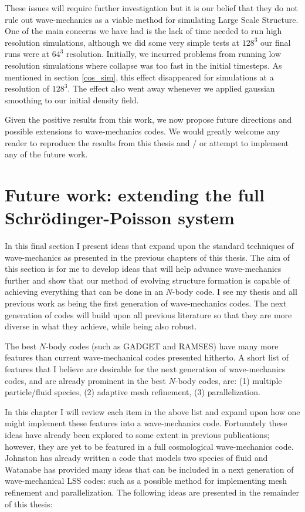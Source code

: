 These issues will require further investigation but it is our belief that they do not rule out wave-mechanics as a viable method for simulating Large Scale Structure. One of the main concerns we have had is the lack of time needed to run high resolution simulations, although we did some very simple tests at $128^3$ our final runs were at $64^3$ resolution. Initially, we incurred problems from running low resolution simulations where collapse was too fast in the initial timesteps. As mentioned in section \ref{cos_sim}, this effect disappeared for simulations at a resolution of $128^3$. The effect also went away whenever we applied gaussian smoothing to our initial density field.

Given the positive results from this work, we now propose future directions and possible extensions to wave-mechanics codes. We would greatly welcome any reader to reproduce the results from this thesis and / or attempt to implement any of the future work.

\section{Future work: extending the full Schr\"odinger-Poisson system}
In this final section I present ideas that expand upon the standard techniques of wave-mechanics as presented in the previous chapters of this thesis. The aim of this section is for me to develop ideas that will help advance wave-mechanics further and show that our method of evolving structure formation is capable of achieving everything that can be done in an $N$-body code. I see my thesis and all previous work as being the first generation of wave-mechanics codes. The next generation of codes will build upon all previous literature so that they are more diverse in what they achieve, while being also robust.

The best $N$-body codes (such as GADGET and RAMSES) have many more features than current wave-mechanical codes presented hitherto. A short list of features that I believe are desirable for the next generation of wave-mechanics codes, and are already prominent in the best $N$-body codes, are: 
(1) multiple particle/fluid species, (2) adaptive mesh refinement, (3) parallelization.

In this chapter I will review each item in the above list and expand upon how one might implement these features into a wave-mechanics code. Fortunately these ideas have already been explored to some extent in previous publications; however, they are yet to be featured in a full cosmological wave-mechanics code. Johnston \citep{bib_rj} has already written a code that models two species of fluid and Watanabe \citep{bib_wat} has provided many ideas that can be included in a next generation of wave-mechanical LSS codes: such as a possible method for implementing mesh refinement and parallelization. The following ideas are presented in the remainder of this thesis:

